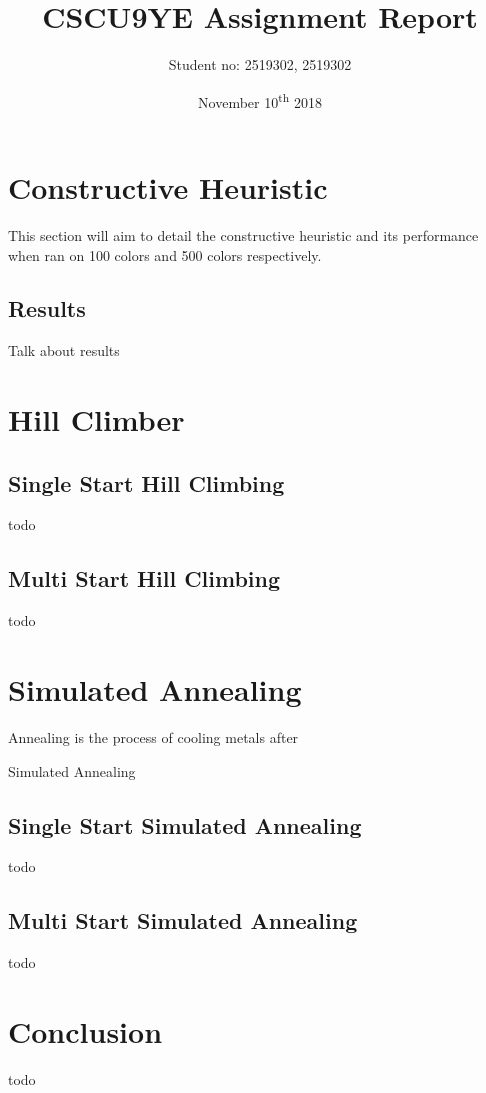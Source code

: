\documentclass[11pt, a4paper]{report}
\title{CSCU9YE Assignment Report}
\author{Student no: 2519302, 2519302}
\date{November 10\textsuperscript{th} 2018}
\begin{document}
\begin{titlepage}
\maketitle
\end{titlepage}
\doublespacing
{}
\tableofcontents
\newpage
\singlespacing

\section*{Constructive Heuristic}
This section will aim to detail the constructive heuristic and its performance when ran on 100 colors and 500 colors respectively.

\subsection*{Results}
Talk about results

\section*{Hill Climber}
\subsection*{Single Start Hill Climbing}
todo

\subsection*{Multi Start Hill Climbing}
todo

\section*{Simulated Annealing}
Annealing is the process of cooling metals after 

Simulated Annealing 

\subsection*{Single Start Simulated Annealing}
todo

\subsection*{Multi Start Simulated Annealing}
todo

\section*{Conclusion}
todo
\end{document}
